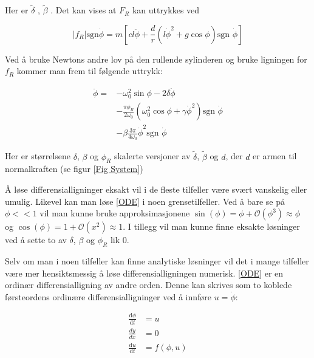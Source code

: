 \documentclass[5p]{elsarticle}
\newcommand{\dd}[2]{\frac{\mathrm{d}{#1}}{\mathrm{d}{#2}}} %
\begin{document}
Her er \(\tilde{\delta}\) , \(\tilde{\beta}\) .
Det kan vises at \(F_R\) kan uttrykkes ved

\begin{equation}
	|f_R|\text{sgn}\dot{\phi} =
	m\left[
		cl\ddot{\phi}+\frac{d}{r}
		\left(l\dot{\phi}^2 + g\cos\phi\right)
		\text{sgn }\dot{\phi}
	\right]
\end{equation}

Ved å bruke Newtons andre lov på den rullende sylinderen 
og bruke ligningen for \(f_R\) kommer man frem til følgende uttrykk:

\begin{equation}
	\begin{split}
		\label{ODE}	
		\ddot{\phi} = 	
		&- \omega_0^2\sin\phi - 2\delta\dot{\phi}	\\
		&- \frac{\pi\phi_R}{2\omega_0}
		\left(\omega_0^2\cos\phi + \gamma\dot{\phi}^2\right) \text{sgn } \dot{\phi} \\
		&- \beta \frac{3\pi}{4\omega_0}\dot{\phi}^2\text{sgn }\dot{\phi} 
	\end{split}
\end{equation}

Her er størrelsene \(\delta\), \(\beta\) og \(\phi_R\) skalerte versjoner av 
\(\tilde{\delta}\), \(\tilde{\beta}\) og \(d\), der \(d\) er armen til normalkraften (se figur \ref{Fig System})


Å løse differensialligninger eksakt vil i de fleste tilfeller være svært vanskelig eller umulig.
Likevel kan man løse \eqref{ODE} i noen grensetilfeller. Ved å bare se på \(\phi << 1\) vil man kunne
bruke approksimasjonene 
\(\sin(\phi) = \phi + \mathcal{O}(\phi^3) \approx \phi\) og 
\(\cos(\phi) = 1 + \mathcal{O}(x^2) \approx 1\).
I tillegg vil man kunne finne eksakte løsninger ved å sette to av \(\delta\), \(\beta\) og \(\phi_R\) lik 0.
\par
Selv om man i noen tilfeller kan finne analytiske løsninger 
vil det i mange tilfeller være mer hensiktsmessig å løse differensialligningen numerisk.
\eqref{ODE} er en ordinær differensialligning av andre orden. 
Denne kan skrives som to koblede førsteordens ordinære differensialligninger ved å innføre \(u = \dot{\phi}\):

\begin{subequations}
	\begin{align}
		\dd{\phi}{t} & = u \\
		\frac{dy}{dx} & = 0 \\
		\dd{u}{t}    & = f(\phi, u) \\
	\end{align}
\end{subequations}
\end{document}
